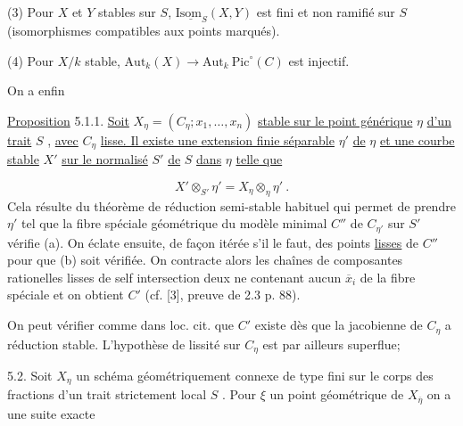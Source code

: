 
(3) Pour  $X$  et  $Y$  stables sur  $S$, $\mathrm{I}\underline{\mathrm{som}}_{S}(X,Y)$  est fini et non ramifié sur $S$  (isomorphismes compatibles aux points marqués).

(4) Pour  $X/k$  stable,  $\mathrm{Aut}_k(X) \longrightarrow \mathrm{Aut}_k\ \mathrm{Pic}^{\circ}(C)$  est injectif.

On a enfin

\underline{Proposition} 5.1.1.  \underline{Soit}  $X_\eta = (C_\eta ; x_1, \ldots, x_n)$  \underline{stable sur le point générique}  $\eta$ \underline{d'un trait}  $S$ , \underline{avec}  $C_\eta$  \underline{lisse. Il existe une extension finie séparable}  $\eta'$  \underline{de}  $\eta$ \underline{et une courbe stable}  $X'$  \underline{sur le normalisé}  $S'$  \underline{de}  $S$  \underline{dans}  $\eta$  \underline{telle que}

\begin{equation*}
X' \otimes_{S'} \eta' = X_{\eta} \otimes_{\eta} \eta' \ .
\end{equation*}
Cela résulte du théorème de réduction semi-stable habituel qui permet de prendre  $\eta'$  tel que la fibre spéciale géométrique du modèle minimal  $C''$  de  $C_{\eta'}$ sur  $S'$  vérifie (a). On éclate ensuite, de façon itérée s'il le faut, des points \underline{lisses} de  $C''$  pour que  (b) soit vérifiée. On contracte alors les chaînes de composantes rationelles lisses de self intersection deux ne contenant aucun  $\overline{x}_i$  de la fibre spéciale et on obtient  $C'$  (cf. [3], preuve de 2.3 p. 88).

On peut vérifier comme dans loc. cit. que  $C'$  existe dès que la jacobienne de  $C_\eta$  a réduction stable. L'hypothèse de lissité sur  $C_\eta$  est par ailleurs superflue;

5.2.  Soit  $X_\eta$  un schéma géométriquement connexe de type fini sur le corps des fractions d'un trait strictement local  $S$ . Pour  $\xi$  un point géométrique de  $X_{\overline{\eta}}$  on a une suite exacte

